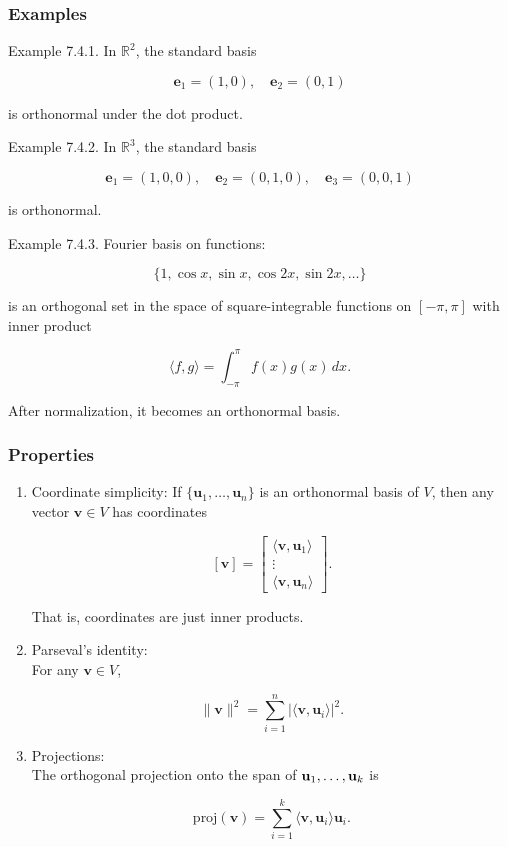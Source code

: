 \documentclass[
  12pt,
  a4paper,
]{article}
\begin{document}
\subsubsection{Examples}\label{examples-7}

Example 7.4.1. In \(\mathbb{R}^2\), the standard basis

\[\mathbf{e}_1 = (1,0), \quad \mathbf{e}_2 = (0,1)\]

is orthonormal under the dot product.

Example 7.4.2. In \(\mathbb{R}^3\), the standard basis

\[\mathbf{e}_1 = (1,0,0), \quad \mathbf{e}_2 = (0,1,0), \quad \mathbf{e}_3 = (0,0,1)\]

is orthonormal.

Example 7.4.3. Fourier basis on functions:

\[\{1, \cos x, \sin x, \cos 2x, \sin 2x, \dots\}\]

is an orthogonal set in the space of square-integrable functions on
\([-\pi,\pi]\) with inner product

\[\langle f,g \rangle = \int_{-\pi}^{\pi} f(x) g(x)\, dx.\]

After normalization, it becomes an orthonormal basis.

\subsubsection{Properties}\label{properties}

\begin{enumerate}
\def\labelenumi{\arabic{enumi}.}
\item
  Coordinate simplicity: If \(\{\mathbf{u}_1,\dots,\mathbf{u}_n\}\) is
  an orthonormal basis of \(V\), then any\\
  vector \(\mathbf{v}\in V\) has coordinates

  \[[\mathbf{v}] = \begin{bmatrix} \langle \mathbf{v}, \mathbf{u}_1 \rangle \\ \vdots \\ \langle \mathbf{v}, \mathbf{u}_n \rangle \end{bmatrix}.\]

  That is, coordinates are just inner products.
\item
  Parseval's identity:\\
  For any \(\mathbf{v} \in V\),

  \[\|\mathbf{v}\|^2 = \sum_{i=1}^n |\langle \mathbf{v}, \mathbf{u}_i \rangle|^2.\]
\item
  Projections:\\
  The orthogonal projection onto the span of
  \(\\{\mathbf{u}_1,\dots,\mathbf{u}_k\\}\) is

  \[\text{proj}(\mathbf{v}) = \sum_{i=1}^k \langle \mathbf{v}, \mathbf{u}_i \rangle \mathbf{u}_i.\]
\end{enumerate}
\end{document}
